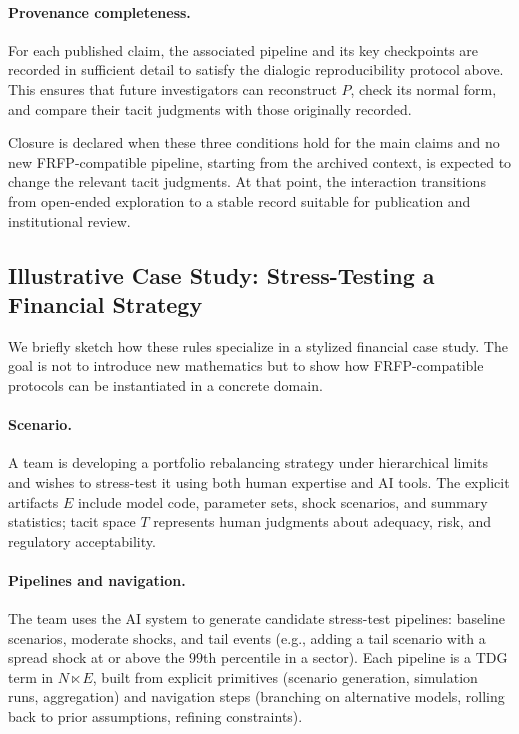 \paragraph{Provenance completeness.}
For each published claim, the associated pipeline and its key checkpoints are
recorded in sufficient detail to satisfy the dialogic reproducibility protocol
above. This ensures that future investigators can reconstruct \(P\), check its
normal form, and compare their tacit judgments with those originally recorded.

Closure is declared when these three conditions hold for the main claims and no
new FRFP-compatible pipeline, starting from the archived context, is expected to
change the relevant tacit judgments. At that point, the interaction transitions
from open-ended exploration to a stable record suitable for publication and
institutional review.

\subsection{Illustrative Case Study: Stress-Testing a Financial Strategy}

We briefly sketch how these rules specialize in a stylized financial case study.
The goal is not to introduce new mathematics but to show how FRFP-compatible
protocols can be instantiated in a concrete domain.

\paragraph{Scenario.}
A team is developing a portfolio rebalancing strategy under hierarchical limits
and wishes to stress-test it using both human expertise and AI tools. The explicit
artifacts \(E\) include model code, parameter sets, shock scenarios, and summary
statistics; tacit space \(T\) represents human judgments about adequacy, risk, and
regulatory acceptability.

\paragraph{Pipelines and navigation.}
The team uses the AI system to generate candidate stress-test pipelines: baseline
scenarios, moderate shocks, and tail events (e.g., adding a tail scenario with a
spread shock at or above the \(99\)th percentile in a sector). Each pipeline is a
TDG term in \(N \ltimes E\), built from explicit primitives (scenario generation,
simulation runs, aggregation) and navigation steps (branching on alternative models,
rolling back to prior assumptions, refining constraints).

